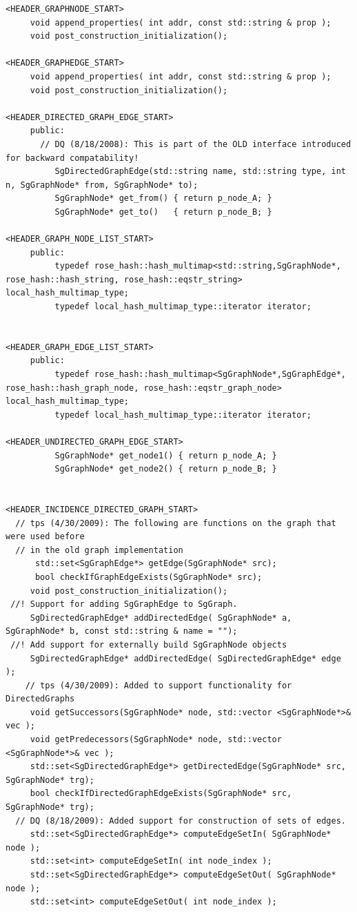 \begin{enumerate}
\begin{lstlisting}
<HEADER_GRAPHNODE_START>
     void append_properties( int addr, const std::string & prop );	
     void post_construction_initialization();

<HEADER_GRAPHEDGE_START>
     void append_properties( int addr, const std::string & prop );
     void post_construction_initialization();

<HEADER_DIRECTED_GRAPH_EDGE_START>
     public:
       // DQ (8/18/2008): This is part of the OLD interface introduced for backward compatability!
          SgDirectedGraphEdge(std::string name, std::string type, int n, SgGraphNode* from, SgGraphNode* to);
          SgGraphNode* get_from() { return p_node_A; }
          SgGraphNode* get_to()   { return p_node_B; }

<HEADER_GRAPH_NODE_LIST_START>
     public:
          typedef rose_hash::hash_multimap<std::string,SgGraphNode*, rose_hash::hash_string, rose_hash::eqstr_string> local_hash_multimap_type;
          typedef local_hash_multimap_type::iterator iterator;


<HEADER_GRAPH_EDGE_LIST_START>
     public:
          typedef rose_hash::hash_multimap<SgGraphNode*,SgGraphEdge*, rose_hash::hash_graph_node, rose_hash::eqstr_graph_node> local_hash_multimap_type;
          typedef local_hash_multimap_type::iterator iterator;

<HEADER_UNDIRECTED_GRAPH_EDGE_START>
          SgGraphNode* get_node1() { return p_node_A; }
          SgGraphNode* get_node2() { return p_node_B; }


<HEADER_INCIDENCE_DIRECTED_GRAPH_START>
  // tps (4/30/2009): The following are functions on the graph that were used before 
  // in the old graph implementation
  	  std::set<SgGraphEdge*> getEdge(SgGraphNode* src);
  	  bool checkIfGraphEdgeExists(SgGraphNode* src);
     void post_construction_initialization();
 //! Support for adding SgGraphEdge to SgGraph.
     SgDirectedGraphEdge* addDirectedEdge( SgGraphNode* a, SgGraphNode* b, const std::string & name = "");
 //! Add support for externally build SgGraphNode objects
     SgDirectedGraphEdge* addDirectedEdge( SgDirectedGraphEdge* edge  );
	// tps (4/30/2009): Added to support functionality for DirectedGraphs		   
     void getSuccessors(SgGraphNode* node, std::vector <SgGraphNode*>& vec );
     void getPredecessors(SgGraphNode* node, std::vector <SgGraphNode*>& vec );
     std::set<SgDirectedGraphEdge*> getDirectedEdge(SgGraphNode* src, SgGraphNode* trg);
     bool checkIfDirectedGraphEdgeExists(SgGraphNode* src, SgGraphNode* trg);
  // DQ (8/18/2009): Added support for construction of sets of edges.
     std::set<SgDirectedGraphEdge*> computeEdgeSetIn( SgGraphNode* node );
     std::set<int> computeEdgeSetIn( int node_index );
     std::set<SgDirectedGraphEdge*> computeEdgeSetOut( SgGraphNode* node );
     std::set<int> computeEdgeSetOut( int node_index );





\end{lstlisting}
\end{enumerate}

